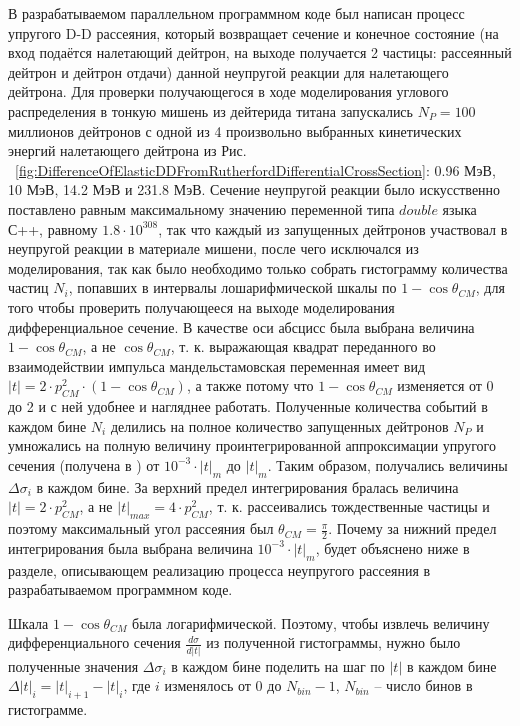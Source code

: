 \documentclass[a4paper,12pt]{article}
\begin{document}
\begin{large}
	В разрабатываемом параллельном программном коде был написан процесс упругого D-D рассеяния, который возвращает сечение и конечное состояние (на вход подаётся налетающий дейтрон, на выходе получается 2 частицы: рассеянный дейтрон и дейтрон отдачи) данной неупругой реакции для налетающего дейтрона.
	Для проверки получающегося в ходе моделирования углового распределения в тонкую мишень из дейтерида титана запускались $N_P=100$ миллионов дейтронов с одной из 4 произвольно выбранных кинетических энергий налетающего дейтрона из Рис. ~\ref{fig:DifferenceOfElasticDDFromRutherfordDifferentialCrossSection}: 0.96 МэВ, 10 МэВ, 14.2 МэВ и 231.8 МэВ.
	Сечение неупругой реакции было искусственно поставлено равным максимальному значению переменной типа $double$ языка С++, равному $1.8 \cdot 10^{308}$, так что каждый из запущенных дейтронов участвовал в неупругой реакции в материале мишени, после чего исключался из моделирования, так как было необходимо только собрать гистограмму количества частиц $N_i$, попавших в интервалы лошарифмической шкалы по $1-\cos{\theta_{CM}}$, для того чтобы проверить получающееся на выходе моделирования дифференциальное сечение.
	В качестве оси абсцисс была выбрана величина $1-\cos{\theta_{CM}}$, а не $\cos{\theta_{CM}}$, т. к. выражающая квадрат переданного во взаимодействии импульса мандельстамовская переменная имеет вид $|t|=2\cdot p^2_{CM} \cdot \left( 1- \cos{\theta_{CM}} \right)$, а также потому что $1-\cos{\theta_{CM}}$ изменяется от 0 до 2 и с ней удобнее и нагляднее работать.
	Полученные количества событий в каждом бине $N_i$ делились на полное количество запущенных дейтронов $N_P$ и умножались на полную величину проинтегрированной аппроксимации упругого сечения (получена в \cite{70/778-T}) от $10^{-3} \cdot |t|_m$ до $|t|_m$.
	Таким образом, получались величины $\Delta \sigma_i$ в каждом бине.
	За верхний предел интегрирования бралась величина $|t|=2\cdot p^2_{CM}$, а не $|t|_{max}=4\cdot p^2_{CM}$, т. к. рассеивались тождественные частицы и поэтому максимальный угол рассеяния был $\theta_{CM}=\frac{\pi}{2}$.
	Почему за нижний предел интегрирования была выбрана величина $10^{-3} \cdot |t|_m$, будет объяснено ниже в разделе, описывающем реализацию процесса неупругого рассеяния в разрабатываемом программном коде.
	
	Шкала $1-\cos{\theta_{CM}}$ была логарифмической.
	Поэтому, чтобы извлечь величину дифференциального сечения $\frac{d\sigma}{d|t|}$ из полученной гистограммы, нужно было полученные значения $\Delta \sigma_i$ в каждом бине поделить на шаг по $|t|$ в каждом бине $\Delta |t|_i=|t|_{i+1}-|t|_i$, где $i$ изменялось от 0 до $N_{bin}-1$, $N_{bin}$ -- число бинов в гистограмме.
	

\end{large}
\end{document}
